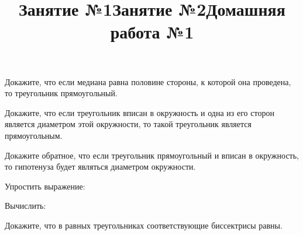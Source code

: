 \title{Занятие №1}
\begin{listofex}
	\item {}
	\item {}
	\item {}
	\item {}
	\item {}
	\item {}
	\item {}
	\item {}
	\item {}
\end{listofex}
\newpage
\title{Занятие №2}
\begin{listofex}
	\item Докажите, что если медиана равна половине стороны, к которой она проведена, то треугольник прямоугольный.
	\item {}
	\item Докажите, что если треугольник вписан в окружность и одна из его сторон является диаметром этой окружности, то такой треугольник является прямоугольным.
	\item Докажите обратное, что если треугольник прямоугольный и вписан в окружность, то гипотенуза будет являться диаметром окружности.
	\item {}
	\item {}
	\item {}
	\item {}
	\item {}
\end{listofex}
\newpage
\title{Домашняя работа №1}
\begin{listofex}
	\item Упростить выражение:
	\begin{enumcols}[itemcolumns=2]
		\item {}
		\item {}
	\end{enumcols}
	\item Вычислить:
	\begin{enumcols}[itemcolumns=2]
		\item {}
		\item {}
	\end{enumcols}
	\item Докажите, что в равных треугольниках соответствующие биссектрисы равны.
	\item {}
	\item {}
	\item {}
\end{listofex}
